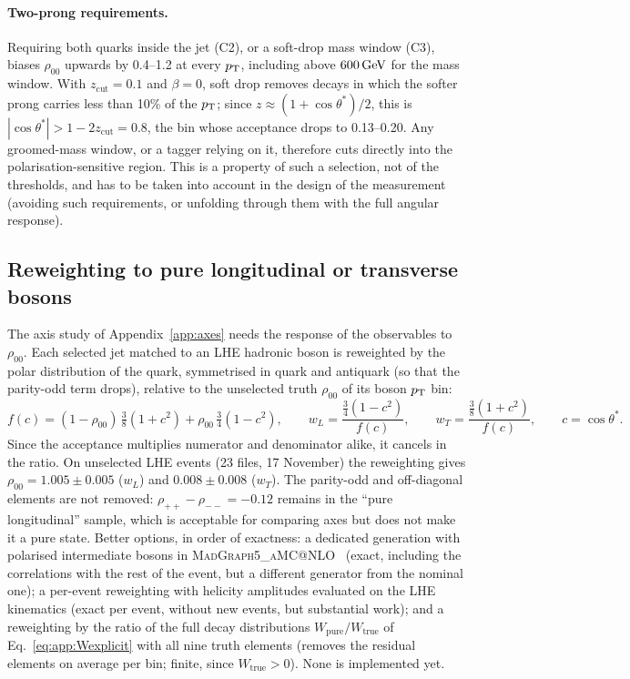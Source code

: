 \paragraph{Two-prong requirements.} Requiring both quarks inside the jet (C2), or a soft-drop mass window (C3), biases
$\rho_{00}$ upwards by 0.4--1.2 at every $p_{\mathrm{T}}$, including above $600\,\mathrm{GeV}$ for the mass window. With
$z_\mathrm{cut} = 0.1$ and $\beta = 0$, soft drop removes decays in which the softer prong carries less than 10\% of the
$p_{\mathrm{T}}$; since $z \approx (1+\cos\theta^*)/2$, this is $|\cos\theta^*| > 1 - 2z_\mathrm{cut} = 0.8$, the bin whose
acceptance drops to 0.13--0.20. Any groomed-mass window, or a tagger relying on it, therefore cuts directly into the
polarisation-sensitive region. This is a property of such a selection, not of the thresholds, and has to be taken
into account in the design of the measurement (avoiding such requirements, or unfolding through them with the full
angular response).

\subsection{Reweighting to pure longitudinal or transverse bosons}
\label{app:truth:reweighting}
The axis study of Appendix~\ref{app:axes} needs the response of the observables to $\rho_{00}$. Each selected jet
matched to an LHE hadronic boson is reweighted by the polar distribution of the quark, symmetrised in quark and
antiquark (so that the parity-odd term drops), relative to the unselected truth $\rho_{00}$ of its boson $p_{\mathrm{T}}$ bin:
\begin{equation}
  f(c) = (1-\rho_{00})\,\tfrac38(1+c^2) + \rho_{00}\,\tfrac34(1-c^2), \qquad
  w_L = \frac{\tfrac34(1-c^2)}{f(c)}, \qquad w_T = \frac{\tfrac38(1+c^2)}{f(c)}, \qquad c = \cos\theta^*.
\end{equation}
Since the acceptance multiplies numerator and denominator alike, it cancels in the ratio. On unselected LHE events (23
 files, 17 November) the reweighting gives $\rho_{00} = 1.005 \pm 0.005$ ($w_L$) and
$0.008 \pm 0.008$ ($w_T$). The parity-odd and off-diagonal elements are not removed: $\rho_{++} - \rho_{--} = -0.12$
remains in the ``pure longitudinal'' sample, which is acceptable for comparing axes but does not make it a pure
state. Better options, in order of exactness: a dedicated generation with polarised intermediate bosons in
\textsc{MadGraph5\_aMC@NLO}~\cite{BuarqueFranzosi:2019boy} (exact, including the correlations with the rest of the
event, but a different generator from the nominal one); a per-event reweighting with helicity amplitudes evaluated on
the LHE kinematics (exact per event, without new events, but substantial work); and a reweighting by the ratio of the
full decay distributions $W_\mathrm{pure}/W_\mathrm{true}$ of Eq.~\eqref{eq:app:Wexplicit} with all nine truth elements
(removes the residual elements on average per bin; finite, since $W_\mathrm{true} > 0$). None is implemented yet.
